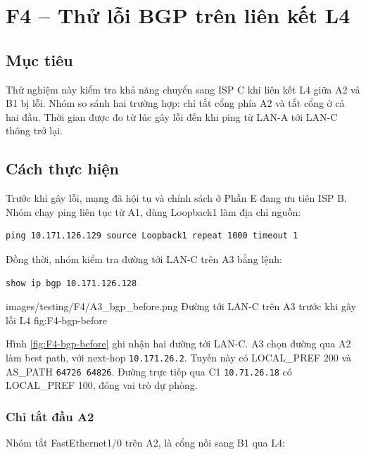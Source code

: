 
\section{F4 -- Thử lỗi BGP trên liên kết L4}
\label{sec:F4}

\subsection{Mục tiêu}

Thử nghiệm này kiểm tra khả năng chuyển
sang ISP C khi liên kết L4 giữa A2 và B1 bị lỗi.
Nhóm so sánh hai trường hợp:
chỉ tắt cổng phía A2 và tắt cổng ở cả hai đầu.
Thời gian được đo từ lúc gây lỗi
đến khi ping từ LAN-A tới LAN-C thông trở lại.

\subsection{Cách thực hiện}

Trước khi gây lỗi, mạng đã hội tụ
và chính sách ở Phần E đang ưu tiên ISP B.
Nhóm chạy ping liên tục từ A1,
dùng Loopback1 làm địa chỉ nguồn:

\begin{lstlisting}
ping 10.171.126.129 source Loopback1 repeat 1000 timeout 1
\end{lstlisting}

Đồng thời, nhóm kiểm tra đường tới LAN-C
trên A3 bằng lệnh:

\begin{lstlisting}
show ip bgp 10.171.126.128
\end{lstlisting}

\partzeroimage
{images/testing/F4/A3_bgp_before.png}
{Đường tới LAN-C trên A3 trước khi gây lỗi L4}
{fig:F4-bgp-before}

Hình \ref{fig:F4-bgp-before} ghi nhận
hai đường tới LAN-C.
A3 chọn đường qua A2 làm best path,
với next-hop \texttt{10.171.26.2}.
Tuyến này có LOCAL\_PREF 200
và AS\_PATH \texttt{64726 64826}.
Đường trực tiếp qua C1 \texttt{10.71.26.18}
có LOCAL\_PREF 100, đóng vai trò dự phòng.

\subsubsection{Chỉ tắt đầu A2}

Nhóm tắt FastEthernet1/0 trên A2,
là cổng nối sang B1 qua L4:

